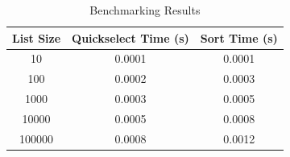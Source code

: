 \documentclass{labReport}
\begin{document}

\begin{table}
    \centering
    \begin{tabular}{|c|c|c|}
    \hline
    \textbf{List Size} & \textbf{Quickselect Time (s)} & \textbf{Sort Time (s)} \\ \hline
    10    & 0.0001 & 0.0001 \\ \hline
    100   & 0.0002 & 0.0003 \\ \hline
    1000  & 0.0003 & 0.0005 \\ \hline
    10000 & 0.0005 & 0.0008 \\ \hline
    100000 & 0.0008 & 0.0012 \\ \hline
    \end{tabular}
    \caption{Benchmarking Results}
    \label{table:benchmark_results}
\end{table}






\end{document}
